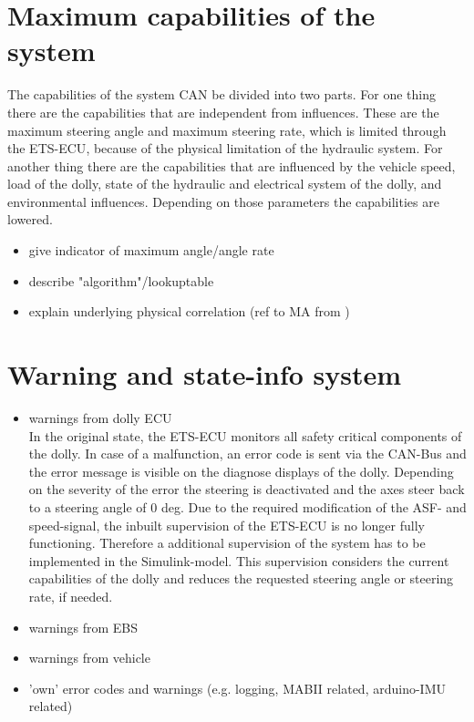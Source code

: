 \documentclass[ExampleMasters.tex]{subfiles}
\begin{document}
\section{Maximum capabilities of the system}
\label{sec:maxi_capabilities}
The capabilities of the system \gls{CAN} be divided into two parts. For one thing there are the capabilities that are independent from influences. These are the maximum steering angle and maximum steering rate, which is limited through the \gls{ETS}-\gls{ECU}, because of the physical limitation of the hydraulic system.
For another thing there are the capabilities that are influenced by the vehicle speed, load of the dolly, state of the hydraulic and electrical system of the dolly, and environmental influences.
Depending on those parameters the capabilities are lowered.
\begin{itemize}
	\item give indicator of maximum angle/angle rate
	\item describe "algorithm"/lookuptable
	\item explain underlying physical correlation (ref to MA from )
\end{itemize}

\section{Warning and state-info system}
\label{sec:warning_system}
\begin{itemize}
	\item warnings from dolly \gls{ECU} \\
	In the original state, the \gls{ETS}-\gls{ECU} monitors all safety critical components of the dolly. In case of a malfunction, an error code is sent via the \gls{CAN}-Bus and the error message is visible on the diagnose displays of the dolly. Depending on the severity of the error the steering is deactivated and the axes steer back to a steering angle of 0 deg.
	Due to the required modification of the \gls{ASF}- and speed-signal, the inbuilt supervision of the \gls{ETS}-\gls{ECU} is no longer fully functioning. Therefore a additional supervision of the system has to be implemented in the Simulink-model. This supervision considers the current capabilities of the dolly and reduces the requested steering angle or steering rate, if needed.    
	\item warnings from \gls{EBS}
	\item warnings from vehicle
	\item 'own' error codes and warnings (e.g. logging, \gls{MABII} related, arduino-\gls{IMU} related)
\end{itemize}
\end{document}
